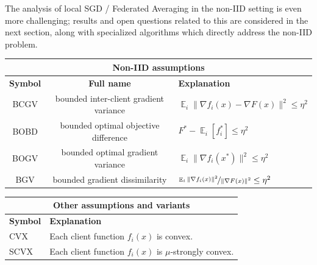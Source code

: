 \documentclass[11pt]{article}
\DeclareMathOperator*{\E}{\mathbb{E}}
\begin{document}


The analysis of local SGD / Federated Averaging in the non-IID setting is even more challenging; results and open questions related to this are considered in the next section, along with specialized algorithms which directly address the non-IID problem.


\begin{table}
\renewcommand{\arraystretch}{1.1}
\begin{center}
\begin{tabularx}{\textwidth}{ccX}
\multicolumn{3}{c}{\textbf{Non-IID assumptions}} \\
\toprule
\textbf{Symbol} & \textbf{Full name} & \textbf{Explanation} \\
\midrule
  BCGV &  bounded inter-client gradient variance & $\E_i \|\nabla f_i(x) - \nabla F(x) \|^2 \leq \eta^2 $ \\
  BOBD & bounded optimal objective difference & $F^* - \E_i[f^*_i] \leq \eta^2 $\\
  BOGV & bounded optimal gradient variance & $\E_i \|\nabla f_i(x^*) \|^2 \leq \eta^2$ \\
  BGV & bounded gradient dissimilarity & $\nicefrac{\E_i \|\nabla f_i(x) \|^2}{\|\nabla F(x) \|^2} \leq \eta^2$ \\
\bottomrule
\end{tabularx}
\vspace{0.5cm}
\begin{tabularx}{\textwidth}{lX}
\\
\multicolumn{2}{c}{\textbf{Other assumptions and variants}} \\
\toprule
\textbf{Symbol} & \textbf{Explanation} \\
\midrule
  CVX &  Each client function $f_i(x)$ is convex.   \\
  SCVX & Each client function $f_i(x)$ is $\mu$-strongly convex. \\

\end{tabularx}
\end{center}
\end{table}
\end{document}
